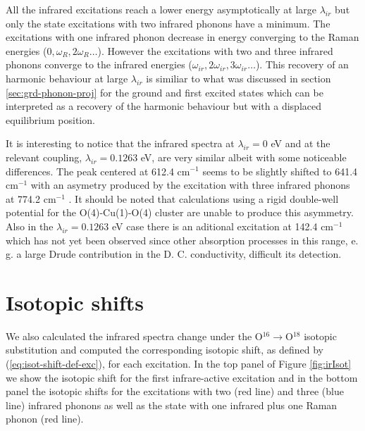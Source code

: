 All the infrared excitations reach a lower energy asymptotically at large $\lambda_{ir}$ but only the state excitations with two infrared phonons have a minimum.
The excitations with one infrared phonon decrease in energy converging to the Raman energies ($0,\omega_R,2\omega_R\ldots$).
However the excitations with two and three infrared phonons converge to the infrared energies ($\omega_{ir},2\omega_{ir},3\omega_{ir}\ldots$).
This recovery of an harmonic behaviour at large $\lambda_{ir}$ is similiar to what was discussed in section \ref{sec:grd-phonon-proj} for the ground and first excited states which can be interpreted as a recovery of the harmonic behaviour but with a displaced equilibrium position.

It is interesting to notice that the infrared spectra at $\lambda_{ir}=0$ eV and at the relevant coupling, $\lambda_{ir}=0.1263$ eV, are very similar albeit with some noticeable differences.
The peak centered at 612.4 cm$^{-1}$ seems to be slightly shifted to 641.4 cm$^{-1}$ with an asymetry produced by the excitation with three infrared phonons at 774.2 cm$^{-1}$ \cite{MustredeLeon1992,Salkola1994}.
It should be noted that calculations using a rigid double-well potential for the O(4)-Cu(1)-O(4) cluster are unable to produce this asymmetry.
Also in the $\lambda_{ir}=0.1263$ eV case there is an aditional excitation at 142.4 cm$^{-1}$ which has not yet been observed since other absorption processes in this range, e. g. a large Drude contribution in the D. C. conductivity, difficult its detection.

\section{Isotopic shifts}
\label{sec:irIsotopicShifts}

We also calculated the infrared spectra change under the O$^{16}\rightarrow$O$^{18}$ isotopic substitution and computed the corresponding isotopic shift, as defined by (\ref{eq:isot-shift-def-exc}), for each excitation.
In the top panel of Figure \ref{fig:irIsot} we show the isotopic shift for the first infrare-active excitation and in the bottom panel the isotopic shifts for the excitations with two (red line) and three (blue line) infrared phonons as well as the state with one infrared plus one Raman phonon (red line).

